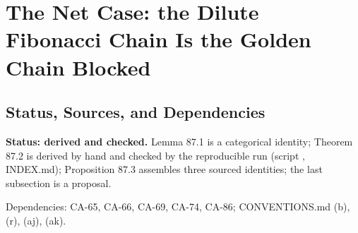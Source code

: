 
\section{The Net Case: the Dilute Fibonacci Chain Is the Golden Chain Blocked}
\label{sec:dilute-fibonacci-blocked}

\subsection{Status, Sources, and Dependencies}

\textbf{Status: derived and checked.}  Lemma 87.1 is a categorical
identity; Theorem 87.2 is derived by hand and checked by the reproducible run
 (script
, INDEX.md); Proposition 87.3
assembles three sourced identities; the last subsection is a proposal.

Dependencies: CA-65, CA-66, CA-69, CA-74, CA-86; CONVENTIONS.md (b), (r),
(aj), (ak).


